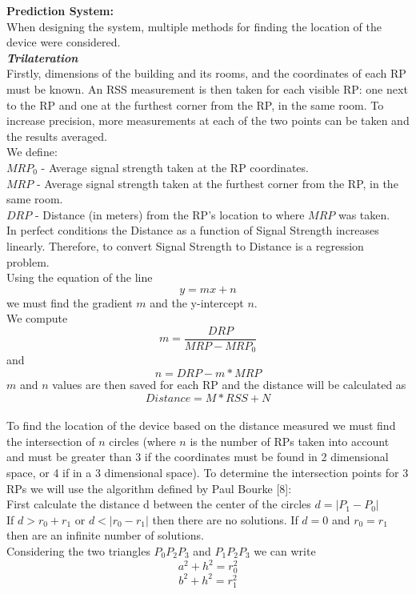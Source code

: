 \textbf{Prediction System:}
\\
When designing the system, multiple methods for finding the location of the device were considered.
\\
\textit{\textbf{Trilateration}}
\\
Firstly, dimensions of the building and its rooms, and the coordinates of each RP must be known. An RSS measurement is then taken for each visible RP: one next to the RP and one at the furthest corner from the RP, in the same room. To increase precision, more measurements at each of the two points can be taken and the results averaged. \\ 
We define: \\
$MRP_0$ - Average signal strength taken at the RP coordinates. \\
$MRP$ - Average signal strength taken at the furthest corner from the RP, in the same room. \\
$DRP$ - Distance (in meters) from the RP's location to where $MRP$ was taken.\\
In perfect conditions the Distance as a function of Signal Strength increases linearly. Therefore, to convert Signal Strength to Distance is a regression problem.\\
Using the equation of the line $$y = mx + n$$ we must find the gradient $m$ and the y-intercept $n$.\\
We compute $$m = \frac{DRP}{MRP - MRP_0}$$
and $$n  = DRP - m * MRP$$
$m$ and $n$ values are then saved for each RP and the distance will be calculated as $$Distance  = M * RSS + N$$
\\
To find the location of the device based on the distance measured we must find the intersection of $n$ circles (where $n$ is the number of RPs taken into account and must be greater than 3 if the coordinates must be found in 2 dimensional space, or 4 if in a 3 dimensional space).  To determine the intersection points for 3 RPs we will use the algorithm defined by Paul Bourke [8]:\\
First calculate the distance d between the center of the circles $d = |P_1 - P_0|$\\
If $d > r_0 + r_1$ or $d < |r_0 - r_1|$ then there are no solutions. If $d = 0$ and $r_0 = r_1$ then are an infinite number of solutions.\\
Considering the two triangles $P_0P_2P_3$ and $P_1P_2P_3$ we can write $$a^2 + h^2 = r_0^2$$ $$b^2 + h^2 = r_1^2$$

